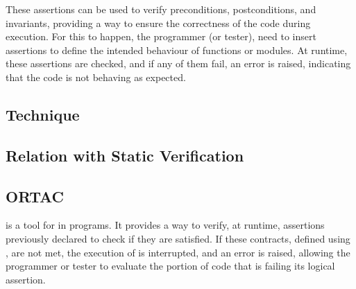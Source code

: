 These assertions can be used to verify preconditions, postconditions, and invariants, 
providing a way to ensure the correctness of the code during execution. For this to 
happen, the programmer (or tester), need to insert assertions to define the intended 
behaviour of functions or modules. At runtime, these assertions are checked, and if 
any of them fail, an error is raised, indicating that the code is not behaving as 
expected.

\subsection{Technique}
\label{sub:technique}

\subsection{Relation with Static Verification}
\label{sub:relation_with_static_verification}

\subsection{ORTAC}
\label{sub:ortac}

\ortac is a tool for \rac in \ocaml programs. It provides a way to verify, at runtime, 
assertions previously declared to check if they are satisfied. If these contracts, 
defined using \why, are not met, the execution of \ortac is interrupted, and an error 
is raised, allowing the programmer or tester to evaluate the portion of code that is 
failing its logical assertion.
